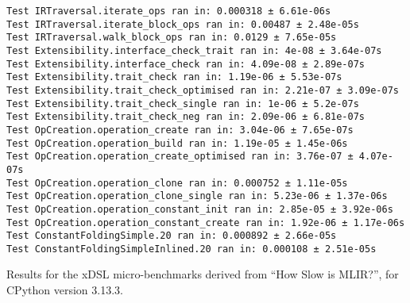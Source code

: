 \begin{code}
    \begin{verbatim}
Test IRTraversal.iterate_ops ran in: 0.000318 ± 6.61e-06s
Test IRTraversal.iterate_block_ops ran in: 0.00487 ± 2.48e-05s
Test IRTraversal.walk_block_ops ran in: 0.0129 ± 7.65e-05s
Test Extensibility.interface_check_trait ran in: 4e-08 ± 3.64e-07s
Test Extensibility.interface_check ran in: 4.09e-08 ± 2.89e-07s
Test Extensibility.trait_check ran in: 1.19e-06 ± 5.53e-07s
Test Extensibility.trait_check_optimised ran in: 2.21e-07 ± 3.09e-07s
Test Extensibility.trait_check_single ran in: 1e-06 ± 5.2e-07s
Test Extensibility.trait_check_neg ran in: 2.09e-06 ± 6.81e-07s
Test OpCreation.operation_create ran in: 3.04e-06 ± 7.65e-07s
Test OpCreation.operation_build ran in: 1.19e-05 ± 1.45e-06s
Test OpCreation.operation_create_optimised ran in: 3.76e-07 ± 4.07e-07s
Test OpCreation.operation_clone ran in: 0.000752 ± 1.11e-05s
Test OpCreation.operation_clone_single ran in: 5.23e-06 ± 1.37e-06s
Test OpCreation.operation_constant_init ran in: 2.85e-05 ± 3.92e-06s
Test OpCreation.operation_constant_create ran in: 1.92e-06 ± 1.17e-06s
Test ConstantFoldingSimple.20 ran in: 0.000892 ± 2.66e-05s
Test ConstantFoldingSimpleInlined.20 ran in: 0.000108 ± 2.51e-05s
    \end{verbatim}
    \caption{Results for the xDSL micro-benchmarks derived from ``How Slow is MLIR?'', for CPython version 3.13.3.}
    \label{listing:how-slow-is-mlir-xdsl-microbenchmark-results-313}
\end{code}



